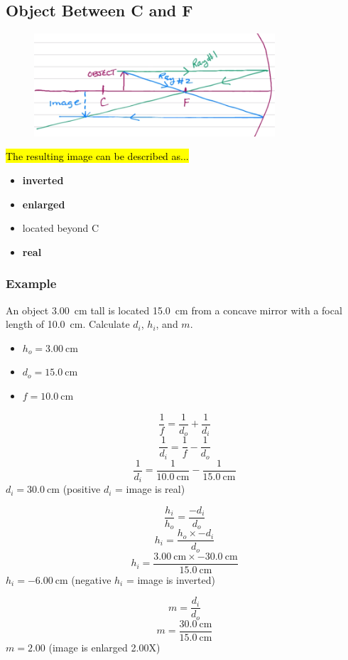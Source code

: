 \documentclass[a4paper,12pt]{article}
\begin{document}
\subsection{Object Between C and F}
\begin{figure}[H]
    \centering
    \includegraphics[width=0.8\textwidth]{concave-mirror-betweenCandF}
\end{figure}
\hl{The resulting image can be described as...}
\begin{itemize}
    \item{\textbf{inverted}}
    \item{\textbf{enlarged}}
    \item{located beyond C}
    \item{\textbf{real}}
\end{itemize}

\subsubsection{Example}
An object \SI{3.00}{\cm} tall is located \SI{15.0}{\cm} from a concave mirror with a focal length of \SI{10.0}{\cm}. Calculate $d_i$, $h_i$, and $m$.
\begin{itemize}
    \item{$h_o = \SI{3.00}{\cm}$}
    \item{$d_o = \SI{15.0}{\cm}$}
    \item{$f = \SI{10.0}{\cm}$}
\end{itemize}
$$\frac{1}{f} = \frac{1}{d_o} + \frac{1}{d_i}$$
$$\frac{1}{d_i} = \frac{1}{f} - \frac{1}{d_o}$$
$$\frac{1}{d_i} = \frac{1}{\SI{10.0}{\cm}} - \frac{1}{\SI{15.0}{\cm}}$$
$d_i = \SI{30.0}{\cm}$ (positive $d_i$ = image is real)

$$\frac{h_i}{h_o} = \frac{-d_i}{d_o}$$
$$h_i = \frac{h_o \times -d_i}{d_o}$$
$$h_i = \frac{\SI{3.00}{\cm} \times \SI{-30.0}{\cm}}{\SI{15.0}{\cm}}$$
$h_i = \SI{-6.00}{\cm}$ (negative $h_i$ = image is inverted)

$$m = \frac{d_i}{d_o}$$
$$m = \frac{\SI{30.0}{\cm}}{\SI{15.0}{\cm}}$$
$m = \num{2.00}$ (image is enlarged 2.00X)
\end{document}
